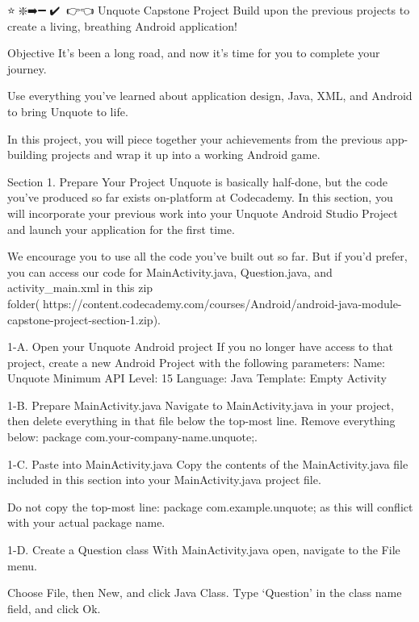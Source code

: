 ⭐🎨❇️➡️➖💎✔️🔗🎦👉👈
Unquote Capstone Project
                Build upon the previous projects to create a living, breathing Android application!


Objective
                It’s been a long road, and now it’s time for you to complete your journey.

                Use everything you’ve learned about application design, Java, XML, and Android to bring Unquote to life.

                In this project, you will piece together your achievements from the previous app-building projects and wrap it up into a working Android game.

Section 1. Prepare Your Project
                Unquote is basically half-done, but the code you’ve produced so far exists on-platform at Codecademy. In this section, you will incorporate your previous work into your Unquote Android Studio Project and launch your application for the first time.

                We encourage you to use all the code you’ve built out so far. But if you’d prefer, you can access our code for MainActivity.java, Question.java, and activity_main.xml in this zip folder(🔗https://content.codecademy.com/courses/Android/android-java-module-capstone-project-section-1.zip).

        1-A. Open your Unquote Android project
                If you no longer have access to that project, create a new Android Project with the following parameters:
                        Name: Unquote
                        Minimum API Level: 15
                        Language: Java
                        Template: Empty Activity

        1-B. Prepare MainActivity.java
                Navigate to MainActivity.java in your project, then delete everything in that file below the top-most line. Remove everything below: package com.{your-company-name}.unquote;.

        1-C. Paste into MainActivity.java
                Copy the contents of the MainActivity.java file included in this section into your MainActivity.java project file.

                Do not copy the top-most line: package com.example.unquote; as this will conflict with your actual package name.

        1-D. Create a Question class
                With MainActivity.java open, navigate to the File menu.

                Choose File, then New, and click Java Class. Type ‘Question’ in the class name field, and click Ok.

